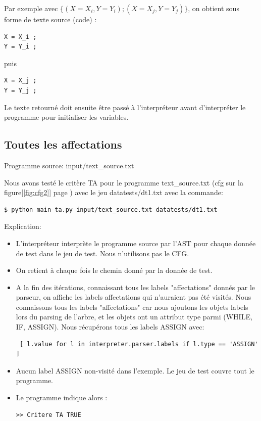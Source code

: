 \documentclass[a4paper]{article}
\begin{document}
Par exemple avec $\{(X=X_i, Y=Y_i);(X=X_j, Y=Y_j)\}$, on obtient sous forme de texte source (code) :
\begin{verbatim}
X = X_i ; 
Y = Y_i ; 
\end{verbatim}
puis
\begin{verbatim}
X = X_j ; 
Y = Y_j ; 
\end{verbatim}

Le texte retourné doit ensuite être passé à l'interpréteur avant d'interpréter le programme pour initialiser les variables. 

\subsection{Toutes les affectations}

Programme source: input/text\_source.txt

Nous avons testé le critère TA pour le programme text\_source.txt (cfg sur la figure[\ref{fig:cfg2}] page \pageref{fig:cfg2}) avec le jeu datatests/dt1.txt avec la commande:

\begin{verbatim}
$ python main-ta.py input/text_source.txt datatests/dt1.txt
\end{verbatim}

Explication: 
\begin{itemize}
\item L'interpréteur interprète le programme source par l'AST pour chaque donnée de test dans le jeu de test. Nous n'utilisons pas le CFG.
\item On retient à chaque fois le chemin donné par la donnée de test.
\item A la fin des itérations, connaissant tous les labels "affectations" donnés par le parseur, on affiche les labels affectations qui n'auraient pas été visités. Nous connaissons tous les labels "affectations" car nous ajoutons les objets labels lors du parsing de l'arbre, et les objets ont un attribut type parmi (WHILE, IF, ASSIGN). Nous récupérons tous les labels ASSIGN avec: 
\begin{verbatim} [ l.value for l in interpreter.parser.labels if l.type == 'ASSIGN' ] \end{verbatim}
\item Aucun label ASSIGN non-visité dans l'exemple. Le jeu de test couvre tout le programme. 
\item Le programme indique alors :
\begin{verbatim}
>> Critere TA TRUE
\end{verbatim}
\end{itemize}
\end{document}
